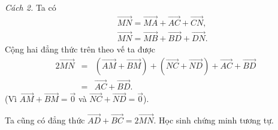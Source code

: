 \begin{vd}
{{
		}
		\noindent\textit{Cách 2.} Ta có
		\begin{eqnarray*}
			&&\overrightarrow {MN}= \overrightarrow {MA}  +  \overrightarrow{AC}  +  \overrightarrow{CN},\\
			&&\overrightarrow {MN}= \overrightarrow {MB}  +  \overrightarrow{BD}  +  \overrightarrow{DN}.
		\end{eqnarray*}
		Cộng hai đẳng thức trên theo vế ta được
		\allowdisplaybreaks
		\begin{eqnarray*}
			2 \overrightarrow {MN}  &=&  \left( \overrightarrow {AM}  +  \overrightarrow{BM}\right)  +  \left( \overrightarrow {NC}  +  \overrightarrow{ND}\right)  +  \overrightarrow{AC}  +  \overrightarrow{BD} \\
			&=&  \overrightarrow{AC}  +  \overrightarrow{BD}.
		\end{eqnarray*} 
		(Vì $ \overrightarrow {AM} + \overrightarrow {BM}=  \overrightarrow{0}$ và $ \overrightarrow {NC}+ \overrightarrow {ND}= \overrightarrow{0}$).\\
		\begin{note} Ta cũng có đẳng thức
			$ \overrightarrow {AD} + \overrightarrow{BC}=2 \overrightarrow {MN}$. Học sinh chứng minh tương tự.
		\end{note}
		
	}
\end{vd}

